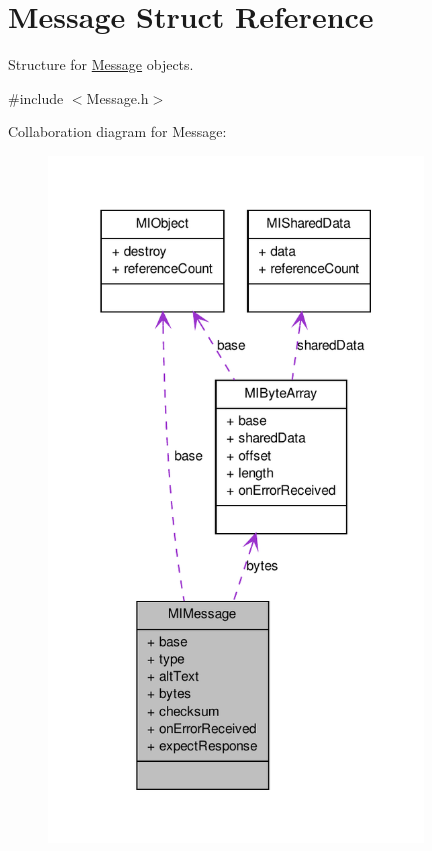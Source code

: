 \hypertarget{struct_m_i_message}{
\section{Message Struct Reference}
\label{struct_m_i_message}
}


Structure for \hyperlink{struct_m_i_message}{Message} objects.  




{\ttfamily \#include $<$Message.h$>$}



Collaboration diagram for Message:
\nopagebreak
\begin{figure}[H]
\begin{center}
\leavevmode
\includegraphics[width=282pt]{struct_m_i_message__coll__graph}
\end{center}
\end{figure}
